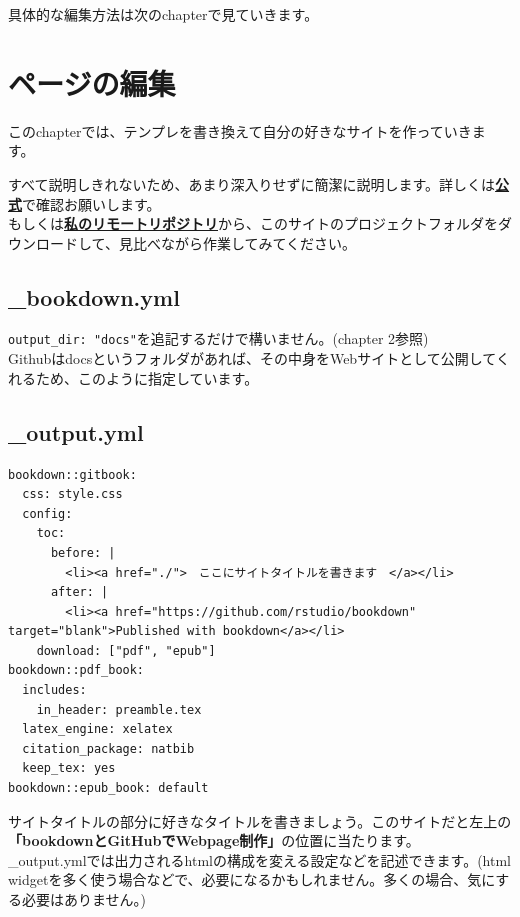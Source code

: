\documentclass[
]{book}
\begin{document}
具体的な編集方法は次のchapterで見ていきます。

\hypertarget{ux30daux30fcux30b8ux306eux7de8ux96c6}{%
\chapter{ページの編集}\label{ux30daux30fcux30b8ux306eux7de8ux96c6}}

このchapterでは、テンプレを書き換えて自分の好きなサイトを作っていきます。

すべて説明しきれないため、あまり深入りせずに簡潔に説明します。詳しくは\textbf{\href{https://bookdown.org/yihui/bookdown/}{公式}}で確認お願いします。\\
もしくは\textbf{\href{https://github.com/sh-2/Rstudio_bookdown/archive/master.zip}{私のリモートリポジトリ}}から、このサイトのプロジェクトフォルダをダウンロードして、見比べながら作業してみてください。

\hypertarget{bookdown.yml}{%
\section{\_bookdown.yml}\label{bookdown.yml}}

\texttt{output\_dir:\ "docs"}を追記するだけで構いません。(chapter 2参照)\\
Githubはdocsというフォルダがあれば、その中身をWebサイトとして公開してくれるため、このように指定しています。

\hypertarget{output.yml}{%
\section{\_output.yml}\label{output.yml}}

\begin{verbatim}
bookdown::gitbook:
  css: style.css
  config:
    toc:
      before: |
        <li><a href="./">　ここにサイトタイトルを書きます　</a></li>
      after: |
        <li><a href="https://github.com/rstudio/bookdown" target="blank">Published with bookdown</a></li>
    download: ["pdf", "epub"]
bookdown::pdf_book:
  includes:
    in_header: preamble.tex
  latex_engine: xelatex
  citation_package: natbib
  keep_tex: yes
bookdown::epub_book: default
\end{verbatim}

サイトタイトルの部分に好きなタイトルを書きましょう。このサイトだと左上の\textbf{「bookdownとGitHubでWebpage制作」}の位置に当たります。\\
\_output.ymlでは出力されるhtmlの構成を変える設定などを記述できます。(html widgetを多く使う場合などで、必要になるかもしれません。多くの場合、気にする必要はありません。)
\end{document}
